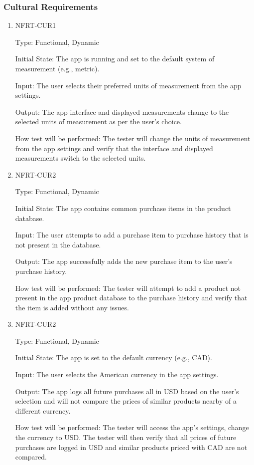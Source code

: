 \documentclass[12pt, titlepage]{article}
\begin{document}


\subsubsection{Cultural Requirements}

\begin{enumerate}

\item{NFRT-CUR1\\}

Type: Functional, Dynamic
					
Initial State: The app is running and set to the default system of measurement (e.g., metric).
					
Input: The user selects their preferred units of measurement from the app settings.
					
Output: The app interface and displayed measurements change to the selected units of measurement as per the user's choice.
					
How test will be performed: The tester will change the units of measurement from the app settings and verify that the interface and displayed measurements switch to the selected units.
					
\item{NFRT-CUR2\\}

Type: Functional, Dynamic
					
Initial State: The app contains common purchase items in the product database.
					
Input: The user attempts to add a purchase item to purchase history that is not present in the database.
					
Output: The app successfully adds the new purchase item to the user's purchase history.
					
How test will be performed: The tester will attempt to add a product not present in the app product database to the purchase history and verify that the item is added without any issues.

\item{NFRT-CUR2\\}

Type: Functional, Dynamic
					
Initial State: The app is set to the default currency (e.g., CAD).
					
Input: The user selects the American currency in the app settings.
					
Output: The app logs all future purchases all in USD based on the user's selection and will not compare the prices of similar products nearby of a different currency.
					
How test will be performed: The tester will access the app's settings, change the currency to USD. The tester will then verify that all prices of future purchases are logged in USD and similar products priced with CAD are not compared.
\end{enumerate}
\end{document}
